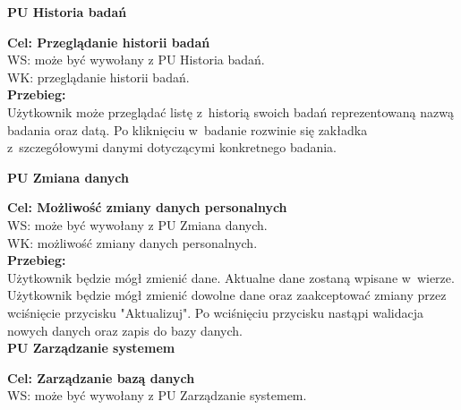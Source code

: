 \documentclass[12pt, letterpaper]{article}
\begin{document}
		
		\textbf{PU Historia badań}
		
		\quad
		
		\textbf{Cel: Przeglądanie historii badań}\\
		
		WS: może być wywołany z PU Historia badań.\\
		
		WK: przeglądanie historii badań.\\
		
		\textbf{Przebieg:}\\
		Użytkownik może przeglądać listę z~historią swoich badań reprezentowaną nazwą badania oraz datą. Po kliknięciu w~badanie rozwinie się zakładka z~szczegółowymi danymi dotyczącymi konkretnego badania.
		 \\
		 
		
		\newpage		
		
		\textbf{PU Zmiana danych}
		
		\quad
		
		\textbf{Cel: Możliwość zmiany danych personalnych}\\
		
		WS: może być wywołany z PU Zmiana danych.\\
		
		WK: możliwość zmiany danych personalnych.\\
		
		\textbf{Przebieg:}\\
		Użytkownik będzie mógł zmienić dane. Aktualne dane zostaną wpisane w~wierze. Użytkownik będzie mógł zmienić dowolne dane oraz zaakceptować zmiany przez wciśnięcie przycisku "Aktualizuj". Po wciśnięciu przycisku nastąpi walidacja nowych danych oraz zapis do bazy danych.
		 \\
			
		
		
		\textbf{PU Zarządzanie systemem}
		
		\quad
		
		\textbf{Cel: Zarządzanie bazą danych}\\
		
		WS: może być wywołany z PU Zarządzanie systemem.\\
		
\end{document}
